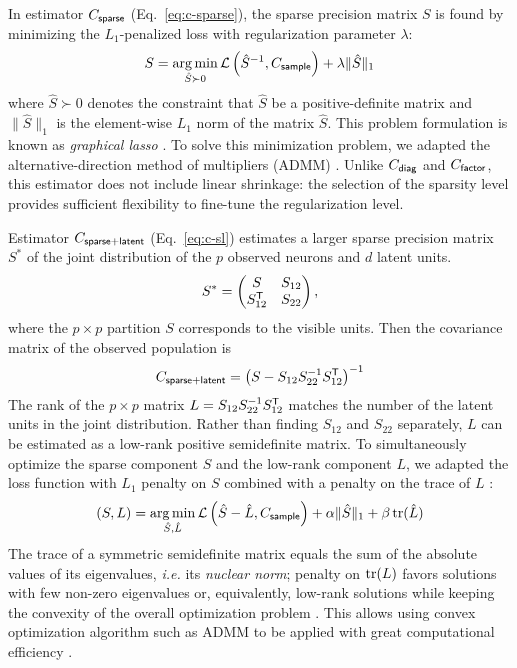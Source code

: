 In estimator $C_{\sf sparse}$ (Eq.~\ref{eq:c-sparse}), the sparse precision matrix $S$ is found by minimizing the $L_1$-penalized loss with regularization parameter $\lambda$:
\begin{equation}
S = \operatorname*{arg\,min}\limits_{\hat S \succ 0} \mathcal L\left({\hat S}^{-1},C_{\sf sample}\right) + \lambda \|\hat S \|_1
\end{equation}
where $\hat S\succ 0$ denotes the constraint that $\hat S$ be a positive-definite matrix and $\|\hat S\|_1$ is the element-wise $L_1$ norm of the matrix $\hat S$. This problem formulation is known as \emph{graphical lasso} \citep{Meinshausen:2006, Friedman:2008}. To solve this minimization problem, we adapted the alternative-direction method of multipliers (ADMM) \citep{Ma:2013}.
Unlike $C_{\sf diag}$ and $C_{\sf factor}$, this estimator does not include linear shrinkage: the selection of the sparsity level provides sufficient flexibility to fine-tune the regularization level.

Estimator $C_{\sf sparse+latent}$ (Eq.~\ref{eq:c-sl}) estimates a larger sparse precision matrix $S^\ast$ of the joint distribution of the $p$ observed neurons and $d$ latent units.
\begin{equation}
S^\ast=
\begin{pmatrix}
S & S_{12} \\
S_{12}^{\sf T} & S_{22}
\end{pmatrix},
\end{equation}
where the $p\times p$ partition $S$ corresponds to the visible units.
Then the covariance matrix of the observed population is
\begin{equation}
C_{\sf sparse+latent} = \left(S-S_{12}S_{22}^{-1}S_{12}^{\sf T}\right)^{-1}
\end{equation}
The rank of the $p\times p$  matrix $L=S_{12}S_{22}^{-1}S_{12}^{\sf T}$ matches the number of the latent units in the joint distribution. Rather than finding $S_{12}$ and $S_{22}$ separately, $L$ can be estimated as a low-rank positive semidefinite matrix. To simultaneously optimize the sparse component $S$ and the low-rank component $L$, we adapted the loss function with $L_1$ penalty on $S$ combined with a penalty on the trace of $L$ \citep{Chandrasekaran:2010,Ma:2013}:
\begin{equation}\label{eq:ma}
(S,L) = \operatorname*{arg\,min}\limits_{\hat S,\hat L} \mathcal L\left(\hat S-\hat L, C_{\sf sample}\right) + \alpha\|\hat S\|_1 + \beta\operatorname{tr}(\hat L)
\end{equation}
The trace of a symmetric semidefinite matrix equals the sum of the absolute values of its eigenvalues, \emph{i.e.} its \emph{nuclear norm}; penalty on $\operatorname{tr}(L)$ favors solutions with few non-zero eigenvalues or, equivalently, low-rank solutions while keeping the convexity of the overall optimization problem \citep{Fazel:2002,Recht:2010}. This allows using convex optimization algorithm such as ADMM to be applied with great computational efficiency \citep{Ma:2013}.

